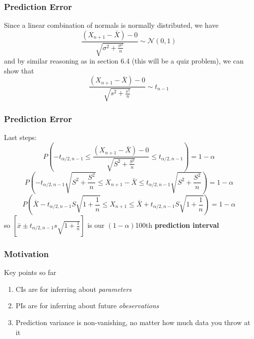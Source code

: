 \documentclass{beamer}
\begin{document}
\begin{frame}
\frametitle{Prediction Error}

Since a linear combination of normals is normally distributed, we have
\[
\frac{(X_{n+1} - \bar{X}) - 0}{\sqrt{\sigma^2 + \frac{\sigma^2}{n}} } \sim \mathcal{N}(0, 1)
\]
and by similar reasoning as in section 6.4 (this will be a quiz problem), we can show that 
\[
\frac{(X_{n+1} - \bar{X}) - 0}{\sqrt{s^2 + \frac{s^2}{n}} } \sim t_{n-1}
\]
\end{frame}

\begin{frame}
\frametitle{Prediction Error}

Last steps:
\[
P \left( -t_{\alpha/2, n-1} \le \frac{(X_{n+1} - \bar{X}) - 0}{\sqrt{S^2 + \frac{S^2}{n}} } \le t_{\alpha/2,n-1} \right) = 1-\alpha
\]
\[
P \left( -t_{\alpha/2, n-1}\sqrt{S^2 + \frac{S^2}{n}} \le X_{n+1} - \bar{X} \le t_{\alpha/2,n-1}\sqrt{S^2 + \frac{S^2}{n}} \right) = 1-\alpha
\]
\[
P \left(\bar{X}  -t_{\alpha/2, n-1} S \sqrt{1+ \frac{1}{n}} \le X_{n+1} \le \bar{X}  + t_{\alpha/2,n-1} S\sqrt{1 + \frac{1}{n}} \right) = 1-\alpha
\]
so $[\bar{x} \pm t_{\alpha/2, n-1} s \sqrt{1+ \frac{1}{n}}]$ is our $(1-\alpha)$100th \textbf{prediction interval}

\end{frame}

\begin{frame}
\frametitle{Motivation}

Key points so far
\begin{enumerate}
\item CIs are for inferring about \emph{parameters}
\item PIs are for inferring about future \emph{obeservations}
\item Prediction variance is non-vanishing, no matter how much data you throw at it
\end{enumerate}

\end{frame}
\end{document}
